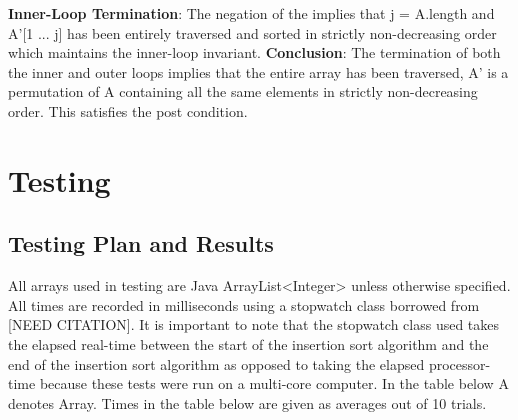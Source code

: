 \documentclass[onecolumn, 12pt, article]{IEEEtran}
\numberwithin{case}{problem}
\numberwithin{condition}{problem}
\numberwithin{condition}{subsection}
\numberwithin{definition}{section}
\theoremstyle{remark}
\numberwithin{question}{problem}
\theoremstyle{plain}
\numberwithin{answer}{problem}
\numberwithin{solution}{section}
\numberwithin{equation}{section}%
\begin{document}
\newline
\textbf{Inner-Loop Termination}: The negation of the implies that j = A.length and A'[1 ... j] has been entirely traversed and sorted in strictly non-decreasing order which maintains the inner-loop invariant. 
\newline
\newline
\textbf{Conclusion}: The termination of both the inner and outer loops implies that the entire array has been traversed, A' is a permutation of A containing all the same elements in strictly non-decreasing order. This satisfies the post condition.

\section{Testing}
\subsection{Testing Plan and Results}
All arrays used in testing are Java ArrayList<Integer> unless otherwise specified. All times are recorded in milliseconds using a stopwatch class borrowed from [NEED CITATION]. %
It is important to note that the stopwatch class used takes the elapsed real-time between the start of the insertion sort algorithm and the end of the insertion sort algorithm as opposed to taking the elapsed processor-time because these tests were run on a multi-core computer. 
In the table below A denotes Array. Times in the table below are given as averages out of 10 trials.
\newline
{}
\end{document}
